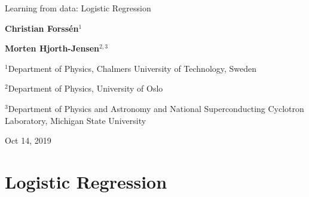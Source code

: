 \documentclass[%
oneside,                 %
final,                   %
10pt]{article}
\begin{document}

\newcommand{\exercisesection}[1]{\subsection*{#1}}







\thispagestyle{empty}

\begin{center}
{\LARGE\bf
\begin{spacing}{1.25}
Learning from data: Logistic Regression
\end{spacing}
}
\end{center}


\begin{center}
{\bf Christian Forssén${}^{1}$} \\ [0mm]
\end{center}


\begin{center}
{\bf Morten Hjorth-Jensen${}^{2, 3}$} \\ [0mm]
\end{center}

\begin{center}
\centerline{{\small ${}^1$Department of Physics, Chalmers University of Technology, Sweden}}
\centerline{{\small ${}^2$Department of Physics, University of Oslo}}
\centerline{{\small ${}^3$Department of Physics and Astronomy and National Superconducting Cyclotron Laboratory, Michigan State University}}
\end{center}
    

\begin{center}
Oct 14, 2019
\end{center}

\vspace{1cm}


\section{Logistic Regression}
\end{document}
